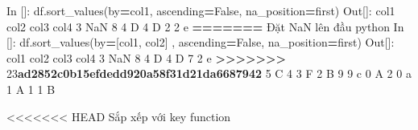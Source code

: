 \documentclass[
]{book}
\newenvironment{Shaded}{\begin{snugshade}}{\end{snugshade}}
\newcommand{\DecValTok}[1]{\textcolor[rgb]{0.00,0.00,0.81}{#1}}
\newcommand{\ErrorTok}[1]{\textcolor[rgb]{0.64,0.00,0.00}{\textbf{#1}}}
\newcommand{\NormalTok}[1]{#1}
\newcommand{\OperatorTok}[1]{\textcolor[rgb]{0.81,0.36,0.00}{\textbf{#1}}}
\newcommand{\StringTok}[1]{\textcolor[rgb]{0.31,0.60,0.02}{#1}}
\newcommand{\VariableTok}[1]{\textcolor[rgb]{0.00,0.00,0.00}{#1}}
\begin{document}
\begin{Shaded}
\begin{Highlighting}[]
\NormalTok{In []: df.sort\_values(by}\OperatorTok{=}\StringTok{\textquotesingle{}col1\textquotesingle{}}\NormalTok{, ascending}\OperatorTok{=}\VariableTok{False}\NormalTok{, na\_position}\OperatorTok{=}\StringTok{\textquotesingle{}first\textquotesingle{}}\NormalTok{)}
\NormalTok{Out[]:}
\NormalTok{  col1  col2  col3 col4}
\DecValTok{3}\NormalTok{  NaN     }\DecValTok{8}     \DecValTok{4}\NormalTok{    D}
\DecValTok{4}\NormalTok{    D     }\DecValTok{2}     \DecValTok{2}\NormalTok{    e}
\OperatorTok{=======}
\NormalTok{Đặt \textasciigrave{}NaN\textasciigrave{} lên đầu}
\NormalTok{\textasciigrave{}\textasciigrave{}\textasciigrave{}python}
\NormalTok{In []: df.sort\_values(by}\OperatorTok{=}\NormalTok{[}\StringTok{\textquotesingle{}col1\textquotesingle{}}\NormalTok{, }\StringTok{\textquotesingle{}col2\textquotesingle{}}\NormalTok{] , ascending}\OperatorTok{=}\VariableTok{False}\NormalTok{, na\_position}\OperatorTok{=}\StringTok{\textquotesingle{}first\textquotesingle{}}\NormalTok{)}
\NormalTok{Out[]:}
\NormalTok{  col1  col2  col3 col4}
\DecValTok{3}\NormalTok{  NaN     }\DecValTok{8}     \DecValTok{4}\NormalTok{    D}
\DecValTok{4}\NormalTok{    D     }\DecValTok{7}     \DecValTok{2}\NormalTok{    e}
\OperatorTok{\textgreater{}\textgreater{}\textgreater{}\textgreater{}\textgreater{}\textgreater{}\textgreater{}} \DecValTok{23}\ErrorTok{ad2852c0b15efdedd920a58f31d21da6687942}
\DecValTok{5}\NormalTok{    C     }\DecValTok{4}     \DecValTok{3}\NormalTok{    F}
\DecValTok{2}\NormalTok{    B     }\DecValTok{9}     \DecValTok{9}\NormalTok{    c}
\DecValTok{0}\NormalTok{    A     }\DecValTok{2}     \DecValTok{0}\NormalTok{    a}
\DecValTok{1}\NormalTok{    A     }\DecValTok{1}     \DecValTok{1}\NormalTok{    B}
\end{Highlighting}
\end{Shaded}

\textless\textless\textless\textless\textless\textless\textless{} HEAD
Sắp xếp với key function
\end{document}
